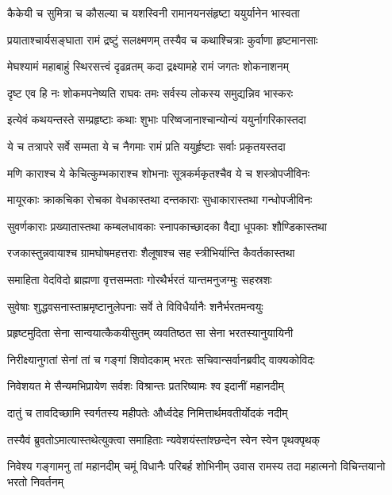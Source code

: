 \twolineshloka
{कैकेयी च सुमित्रा च कौसल्या च यशस्विनी}
{रामानयनसंहृष्टा ययुर्यानेन भास्वता} %

\twolineshloka
{प्रयाताश्चार्यसङ्घाता रामं द्रष्टुं सलक्ष्मणम्}
{तस्यैव च कथाश्चित्राः कुर्वाणा हृष्टमानसाः} %

\twolineshloka
{मेघश्यामं महाबाहुं स्थिरसत्त्वं दृढव्रतम्}
{कदा द्रक्ष्यामहे रामं जगतः शोकनाशनम्} %

\twolineshloka
{दृष्ट एव हि नः शोकमपनेष्यति राघवः}
{तमः सर्वस्य लोकस्य समुद्यन्निव भास्करः} %

\twolineshloka
{इत्येवं कथयन्तस्ते सम्प्रहृष्टाः कथाः शुभाः}
{परिष्वजानाश्चान्योन्यं ययुर्नागरिकास्तदा} %

\twolineshloka
{ये च तत्रापरे सर्वे सम्मता ये च नैगमाः}
{रामं प्रति ययुर्हृष्टाः सर्वाः प्रकृतयस्तदा} %

\twolineshloka
{मणि काराश्च ये केचित्कुम्भकाराश्च शोभनाः}
{सूत्रकर्मकृतश्चैव ये च शस्त्रोपजीविनः} %

\twolineshloka
{मायूरकाः क्राकचिका रोचका वेधकास्तथा}
{दन्तकाराः सुधाकारास्तथा गन्धोपजीविनः} %

\twolineshloka
{सुवर्णकाराः प्रख्यातास्तथा कम्बलधावकाः}
{स्नापकाच्छादका वैद्या धूपकाः शौण्डिकास्तथा} %

\twolineshloka
{रजकास्तुन्नवायाश्च ग्रामघोषमहत्तराः}
{शैलूषाश्च सह स्त्रीभिर्यान्ति कैवर्तकास्तथा} %

\twolineshloka
{समाहिता वेदविदो ब्राह्मणा वृत्तसम्मताः}
{गोरथैर्भरतं यान्तमनुजग्मुः सहस्रशः} %

\twolineshloka
{सुवेषाः शुद्धवसनास्ताम्रमृष्टानुलेपनाः}
{सर्वे ते विविधैर्यानैः शनैर्भरतमन्वयुः} %

\twolineshloka
{प्रहृष्टमुदिता सेना सान्वयात्कैकयीसुतम्}
{व्यवतिष्ठत सा सेना भरतस्यानुयायिनी} %

\twolineshloka
{निरीक्ष्यानुगतां सेनां तां च गङ्गां शिवोदकाम्}
{भरतः सचिवान्सर्वानब्रवीद् वाक्यकोविदः} %

\twolineshloka
{निवेशयत मे सैन्यमभिप्रायेण सर्वशः}
{विश्रान्तः प्रतरिष्यामः श्व इदानीं महानदीम्} %

\twolineshloka
{दातुं च तावदिच्छामि स्वर्गतस्य महीपतेः}
{और्ध्वदेह निमित्तार्थमवतीर्योदकं नदीम्} %

\twolineshloka
{तस्यैवं ब्रुवतोऽमात्यास्तथेत्युक्त्वा समाहिताः}
{न्यवेशयंस्तांश्छन्देन स्वेन स्वेन पृथक्पृथक्} %

\fourlineindentedshloka
{निवेश्य गङ्गामनु तां महानदीम्}
{चमूं विधानैः परिबर्ह शोभिनीम्}
{उवास रामस्य तदा महात्मनो}
{विचिन्तयानो भरतो निवर्तनम्} %


